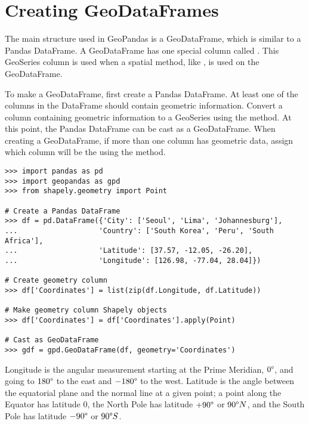 \section*{Creating GeoDataFrames} %

The main structure used in GeoPandas is a GeoDataFrame, which is similar to a Pandas DataFrame.
A GeoDataFrame has one special column called .
This GeoSeries column is used when a spatial method, like , is used on the GeoDataFrame.

To make a GeoDataFrame, first create a Pandas DataFrame.
At least one of the columns in the DataFrame should contain geometric information.
Convert a column containing geometric information to a GeoSeries using the  method.
At this point, the Pandas DataFrame can be cast as a GeoDataFrame.
When creating a GeoDataFrame, if more than one column has geometric data, assign which column will be the  using the  method.

\begin{lstlisting}
>>> import pandas as pd
>>> import geopandas as gpd
>>> from shapely.geometry import Point

# Create a Pandas DataFrame
>>> df = pd.DataFrame({'City': ['Seoul', 'Lima', 'Johannesburg'],
...                   'Country': ['South Korea', 'Peru', 'South Africa'],
...                   'Latitude': [37.57, -12.05, -26.20],
...                   'Longitude': [126.98, -77.04, 28.04]})
                                 
# Create geometry column
>>> df['Coordinates'] = list(zip(df.Longitude, df.Latitude))

# Make geometry column Shapely objects
>>> df['Coordinates'] = df['Coordinates'].apply(Point)

# Cast as GeoDataFrame
>>> gdf = gpd.GeoDataFrame(df, geometry='Coordinates')
\end{lstlisting}

\begin{info}
Longitude is the angular measurement starting at the Prime Meridian, $0\degree$, and going to $180\degree$ to the east and $-180\degree$ to the west.
Latitude is the angle between the equatorial plane and the normal line at a given point; a point along the Equator has latitude $0$, the North Pole has latitude $+90\degree$ or $90\degree N$, and the South Pole has latitude $-90\degree$ or $90\degree S$.
\end{info}

